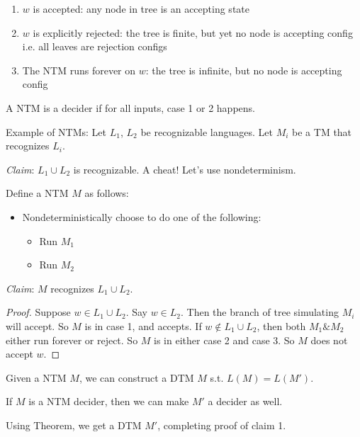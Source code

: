 \begin{enumerate}
    \item $w$ is accepted: any node in tree is an accepting state
    \item $w$ is explicitly rejected: the tree is finite, but yet no node is accepting config i.e. all leaves are rejection configs
    \item The NTM runs forever on $w$: the tree is infinite, but no node is accepting config
\end{enumerate}

\begin{definition}
    A NTM is a decider if for all inputs, case 1 or 2 happens.
\end{definition}

Example of NTMs: Let $L_1$, $L_2$ be recognizable languages. Let $M_i$ be a TM that recognizes $L_i$.

\emph{Claim}: $L_1 \cup L_2$ is recognizable. A cheat! Let's use nondeterminism.

\begin{definition}
    Define a NTM $M$ as follows:

    \begin{itemize}
        \item Nondeterministically choose to do one of the following:
        \begin{itemize}
            \item Run $M_1$
            \item Run $M_2$
        \end{itemize}
      \end{itemize}
\end{definition}

\emph{Claim}: $M$ recognizes $L_1 \cup L_2$.

\begin{proof}
    Suppose $w \in L_1 \cup L_2$. Say $w \in L_2$. Then the branch of tree simulating $M_i$ will accept. So $M$ is in case 1, and accepts. If $w \notin L_1 \cup L_2$, then both $M_1 \& M_2$ either run forever or reject. So $M$ is in either case 2 and case 3. So $M$ does not accept $w$.
\end{proof}

\begin{theorem}
    Given a NTM $M$, we can construct a DTM $M$ s.t. $L(M) = L(M')$.
\end{theorem}

\begin{theorem}
    If $M$ is a NTM decider, then we can make $M'$ a decider as well.
\end{theorem}

Using Theorem, we get a DTM $M'$, completing proof of claim 1.
